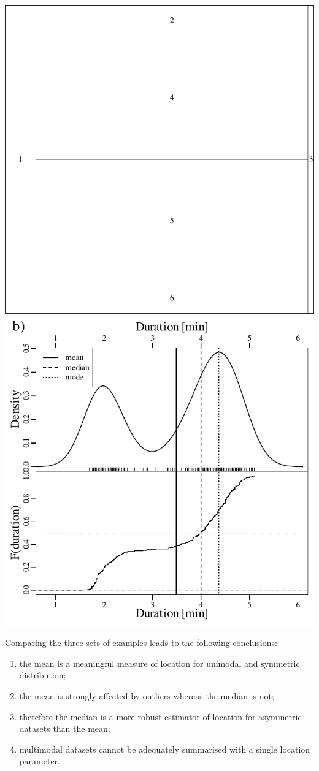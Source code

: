\noindent\includegraphics[width=.5\textwidth]{../figures/vegetationlocation.pdf}
\includegraphics[width=.5\textwidth]{../figures/eruptionslocation.pdf}
\begingroup {}
\label{fig:vegetationlocation}
\endgroup

Comparing the three sets of examples leads to the following
conclusions:

\begin{enumerate}
\item the mean is a meaningful measure of location for unimodal and
  symmetric distribution;
\item the mean is strongly affected by outliers whereas the median is
  not;
\item therefore the median is a more robust estimator of location for
  asymmetric datasets than the mean;
\item multimodal datasets cannot be adequately summarised with a
  single location parameter.
\end{enumerate}

